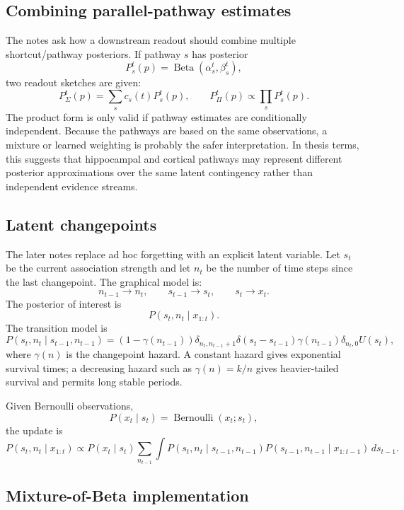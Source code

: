 \subsection{Combining parallel-pathway estimates}

The notes ask how a downstream readout should combine multiple shortcut/pathway posteriors. If pathway $s$ has posterior
\[
P_s^t(p)=\operatorname{Beta}(\alpha_s^t,\beta_s^t),
\]
two readout sketches are given:
\[
P_{\Sigma}^t(p)=\sum_s c_s(t)P_s^t(p),
\qquad
P_{\Pi}^t(p)\propto\prod_s P_s^t(p).
\]
The product form is only valid if pathway estimates are conditionally independent. Because the pathways are based on the same observations, a mixture or learned weighting is probably the safer interpretation. In thesis terms, this suggests that hippocampal and cortical pathways may represent different posterior approximations over the same latent contingency rather than independent evidence streams.

\subsection{Latent changepoints}

The later notes replace ad hoc forgetting with an explicit latent variable. Let $s_t$ be the current association strength and let $n_t$ be the number of time steps since the last changepoint. The graphical model is:
\[
n_{t-1}\rightarrow n_t,\qquad
s_{t-1}\rightarrow s_t,\qquad
s_t\rightarrow x_t.
\]
The posterior of interest is
\[
P(s_t,n_t\mid x_{1:t}).
\]
The transition model is
\[
P(s_t,n_t\mid s_{t-1},n_{t-1})
=(1-\gamma(n_{t-1}))
\delta_{n_t,n_{t-1}+1}\delta(s_t-s_{t-1})
\gamma(n_{t-1})\delta_{n_t,0}U(s_t),
\]
where $\gamma(n)$ is the changepoint hazard. A constant hazard gives exponential survival times; a decreasing hazard such as $\gamma(n)=k/n$ gives heavier-tailed survival and permits long stable periods.

Given Bernoulli observations,
\[
P(x_t\mid s_t)=\operatorname{Bernoulli}(x_t;s_t),
\]
the update is
\[
P(s_t,n_t\mid x_{1:t})
\propto
P(x_t\mid s_t)
\sum_{n_{t-1}}\int
P(s_t,n_t\mid s_{t-1},n_{t-1})
P(s_{t-1},n_{t-1}\mid x_{1:t-1})
\,ds_{t-1}.
\]

\subsection{Mixture-of-Beta implementation}

